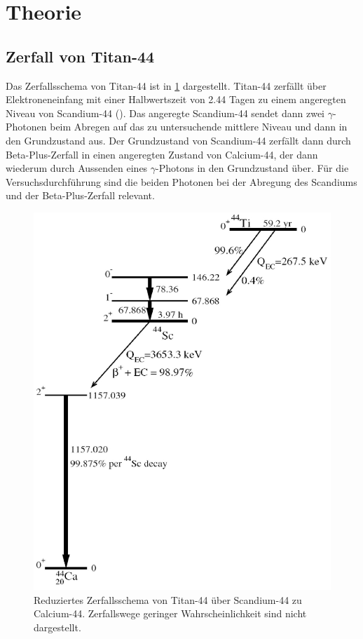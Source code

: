 \documentclass[
	a4paper,
	12pt,
	pagesize,
	ngerman
]{scrartcl}
\begin{document}
  \section{Theorie}
	\subsection{Zerfall von Titan-44}

	Das Zerfallsschema von Titan-44 ist in \cref{fig_Zerfallsschema} dargestellt. Titan-44 zerfällt über Elektroneneinfang mit einer Halbwertszeit von \SI{2,44}{} Tagen zu einem angeregten Niveau von Scandium-44 (\cite{Anleitung}).
	Das angeregte Scandium-44 sendet dann zwei $\gamma$-Photonen beim Abregen auf das zu untersuchende mittlere Niveau und dann in den Grundzustand aus.
	Der Grundzustand von Scandium-44 zerfällt dann durch Beta-Plus-Zerfall in einen angeregten Zustand von Calcium-44, der dann wiederum durch Aussenden eines $\gamma$-Photons in den Grundzustand über.
	Für die Versuchsdurchführung sind die beiden Photonen bei der Abregung des Scandiums und der Beta-Plus-Zerfall relevant.

	\begin{figure}[H]
			\includegraphics[width=0.6\linewidth]{img/44Ti-decay_reduziert}
			\caption{
			Reduziertes Zerfallsschema von Titan-44 über Scandium-44 zu Calcium-44. Zerfallswege geringer Wahrscheinlichkeit sind nicht dargestellt.
			\cite{Zerfallsschema} %
			}
			\label{fig_Zerfallsschema}
	\end{figure}
\end{document}

